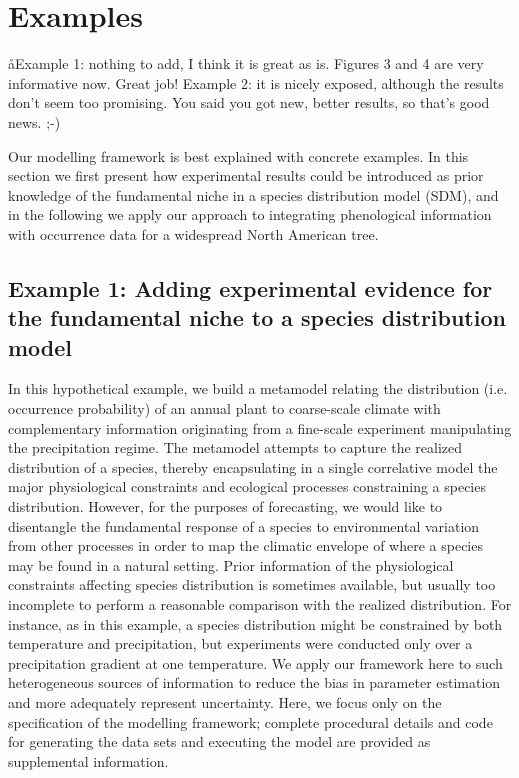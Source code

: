 \section*{Examples}
\aa{Example 1: nothing to add, I think it is great as is. Figures 3 and 4 are very informative now. Great job! 
Example 2: it is nicely exposed, although the results don't seem too promising. You said you got new, better results, so that’s good news. ;-)}

Our modelling framework is best explained with concrete examples. 
In this section we first present how experimental results could be introduced as prior knowledge of the fundamental niche in a species distribution model (\ac{SDM}), and in the following we apply our approach to integrating phenological information with occurrence data for a widespread North American tree.

\subsection*{Example 1: Adding experimental evidence for the fundamental niche to a species distribution model} 

In this hypothetical example, we build a metamodel relating the distribution (i.e. occurrence probability) of an annual plant to coarse-scale climate with complementary information originating from a fine-scale experiment manipulating the precipitation regime.
The metamodel attempts to capture the realized distribution of a species, thereby encapsulating in a single correlative model the major physiological constraints and ecological processes constraining a species distribution. 
However, for the purposes of forecasting, we would like to disentangle the fundamental response of a species to environmental variation from other processes in order to map the climatic envelope of where a species may be found in a natural setting. 
Prior information of the physiological constraints affecting species distribution is sometimes available, but usually too incomplete to perform a reasonable comparison with the realized distribution.
For instance, as in this example, a species distribution might be constrained by both temperature and precipitation, but experiments were conducted only over a precipitation gradient at one temperature. 
We apply our framework here to such heterogeneous sources of information to reduce the bias in parameter estimation and more adequately represent uncertainty. 
Here, we focus only on the specification of the modelling framework; complete procedural details and code for generating the data sets and executing the model are provided as supplemental information.

